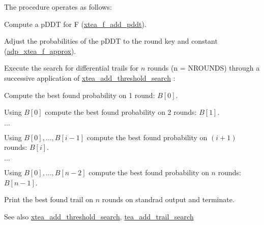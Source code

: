 \-The procedure operates as follows\-:


\begin{DoxyEnumerate}
\item \-Compute a p\-D\-D\-T for \-F (\hyperlink{xtea-f-add-pddt_8hh_a98d696f2047ccb8b1a07f777a55a1168}{xtea\-\_\-f\-\_\-add\-\_\-pddt}).
\item \-Adjust the probabilities of the p\-D\-D\-T to the round key and constant (\hyperlink{adp-xtea-f-fk_8hh_a07bf299450a988931eb46ec5cca05150}{adp\-\_\-xtea\-\_\-f\-\_\-approx}).
\item \-Execute the search for differential trails for $n$ rounds (n = \-N\-R\-O\-U\-N\-D\-S) through a successive application of \hyperlink{xtea-add-threshold-search_8hh_a18a7f48b1b44dcf0c408b2988cec4cf5}{xtea\-\_\-add\-\_\-threshold\-\_\-search} \-:
\begin{DoxyItemize}
\item \-Compute the best found probability on 1 round\-: $B[0]$.
\item \-Using $B[0]$ compute the best found probability on 2 rounds\-: $B[1]$.
\item $\ldots$
\item \-Using $B[0],\ldots,B[i-1]$ compute the best found probability on $(i+1)$ rounds\-: $B[i]$.
\item $\ldots$
\item \-Using $B[0],\ldots,B[n-2]$ compute the best found probability on $n$ rounds\-: $B[n-1]$.
\end{DoxyItemize}
\item \-Print the best found trail on $n$ rounds on standrad output and terminate.
\end{DoxyEnumerate}

\begin{DoxySeeAlso}{\-See also}
\hyperlink{xtea-add-threshold-search_8hh_a18a7f48b1b44dcf0c408b2988cec4cf5}{xtea\-\_\-add\-\_\-threshold\-\_\-search}, \hyperlink{tea-add-threshold-search_8hh_aa0f68e80d4599027b9a5c581891af32f}{tea\-\_\-add\-\_\-trail\-\_\-search} 
\end{DoxySeeAlso}
